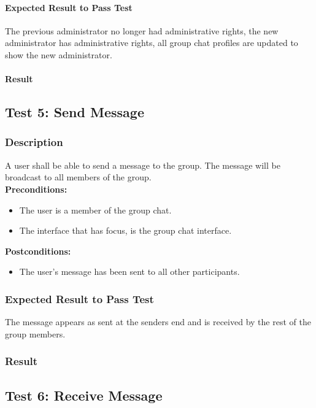 \documentclass[11pt]{article}
\begin{document}
\paragraph{Expected Result to Pass Test}
The previous administrator no longer had administrative rights, the new administrator has administrative rights, all group chat profiles are updated to show the new administrator.
\paragraph{Result}

\subsection{Test 5: Send Message}
\subsubsection{Description}
A user shall be able to send a message to the group.
The message will be broadcast to all members of the group.\\
\textbf{Preconditions:} 
\begin{itemize}
\item The user is a member of the group chat.
\item The interface that has focus, is the group chat interface.
\end{itemize}
\textbf{Postconditions:}
\begin{itemize}
\item The user's message has been sent to all other participants.
\end{itemize}
\subsubsection{Expected Result to Pass Test}
The message appears as sent at the senders end and is received by the rest of the group members.
\subsubsection{Result}

\subsection{Test 6: Receive Message}
\end{document}
